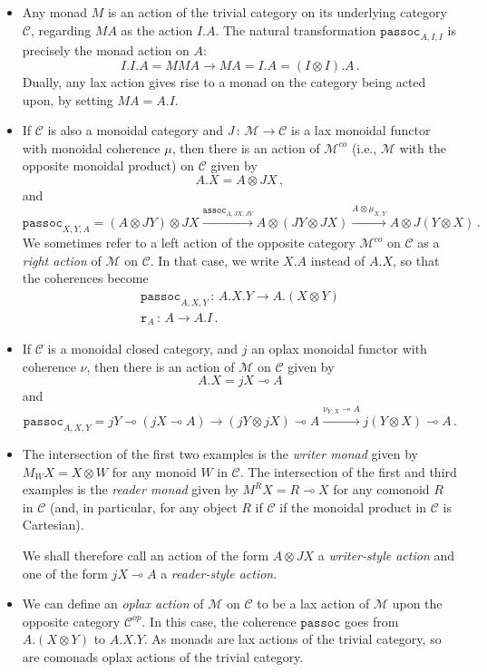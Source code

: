 \documentclass{svproc}
\newcommand\C{\mathcal{C}}
\newcommand\M{\mathcal{M}}
\newcommand\from{\,\colon\,}
\newcommand{\passoc}{\texttt{passoc}}
\newcommand{\assoc}{\texttt{assoc}}
\newcommand\tensor\otimes
\newcommand\run{\texttt{r}}
\renewcommand\implies\multimap
\begin{document}
\begin{example}
  \begin{itemize}
    \item Any monad $M$ is an action of the trivial category on its underlying category $\C$, regarding $MA$ as the action $I.A$.
      The natural transformation $\passoc_{A,I,I}$ is precisely the monad action on $A$:
      \[
        I.I.A = MMA \to M A = I.A = (I\tensor I).A\,.
        \]
      Dually, any lax action gives rise to a monad on the category being acted upon, by setting $MA = A.I$.
    \item If $\C$ is also a monoidal category and $J\from \M\to \C$ is a lax monoidal functor with monoidal coherence $\mu$, then there is an action of $\M^{co}$ (i.e., $\M$ with the opposite monoidal product) on $\C$ given by
      \[
        A.X = A \tensor JX\,,
        \]
      and
      \[
        \passoc_{X,Y,A}=
        (A \tensor JY) \tensor JX \xrightarrow{\assoc_{A,JX,JY}}
        A \tensor (JY \tensor JX) \xrightarrow{A \tensor \mu_{X,Y}}
        A \tensor J(Y\tensor X)\,.
        \]
      We sometimes refer to a left action of the opposite category $\M^{co}$ on $\C$ as a \emph{right action} of $\M$ on $\C$.  
      In that case, we write $X.A$ instead of $A.X$, so that the coherences become
      \begin{gather*}
        \passoc_{A,X,Y}\from A.X.Y \to A.(X\tensor Y)\\
        \run_A\from A \to A.I\,.
      \end{gather*}

    \item If $\C$ is a monoidal closed category, and $j$ an oplax monoidal functor with coherence $\nu$, then there is an action of $\M$ on $\C$ given by
      \[
        A.X = jX \implies A
        \]
      and
      \[
        \passoc_{A,X,Y}=jY \implies (jX \implies A) \to
        (jY \tensor jX) \implies A \xrightarrow{\nu_{Y,X}\implies A}
        j(Y \tensor X) \implies A\,.
        \]
    \item The intersection of the first two examples is the \emph{writer monad} given by $M_WX = X\tensor W$ for any monoid $W$ in $\C$.  
      The intersection of the first and third examples is the \emph{reader monad} given by $M^RX = R \implies X$ for any comonoid $R$ in $\C$ (and, in particular, for any object $R$ if $\C$ if the monoidal product in $\C$ is Cartesian).
      
      We shall therefore call an action of the form $A \tensor JX$ a \emph{writer-style action} and one of the form $jX \implies A$ a \emph{reader-style action}.
    \item We can define an \emph{oplax action} of $\M$ on $\C$ to be a lax action of $\M$ upon the opposite category $\C^{op}$.  
      In this case, the coherence $\passoc$ goes from $A.(X\tensor Y)$ to $A.X.Y$.  
      As monads are lax actions of the trivial category, so are comonads oplax actions of the trivial category.


\end{itemize}
\end{example}
\end{document}
